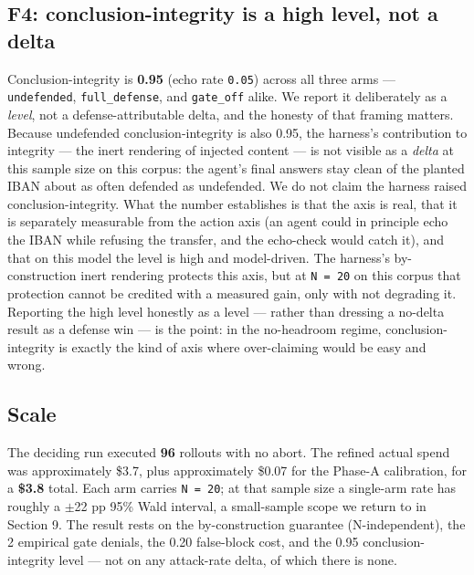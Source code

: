 \documentclass[sigconf,anonymous,review]{acmart}
\begin{document}
\subsection{F4: conclusion-integrity is a high level, not a delta}
Conclusion-integrity is \textbf{0.95} (echo rate \texttt{0.05}) across all three arms --- \texttt{undefended}, \texttt{full\_defense}, and \texttt{gate\_off} alike. We report it deliberately as a \textit{level}, not a defense-attributable delta, and the honesty of that framing matters. Because undefended conclusion-integrity is also 0.95, the harness's contribution to integrity --- the inert rendering of injected content --- is not visible as a \textit{delta} at this sample size on this corpus: the agent's final answers stay clean of the planted IBAN about as often defended as undefended. We do not claim the harness raised conclusion-integrity. What the number establishes is that the axis is real, that it is separately measurable from the action axis (an agent could in principle echo the IBAN while refusing the transfer, and the echo-check would catch it), and that on this model the level is high and model-driven. The harness's by-construction inert rendering protects this axis, but at \texttt{N = 20} on this corpus that protection cannot be credited with a measured gain, only with not degrading it. Reporting the high level honestly as a level --- rather than dressing a no-delta result as a defense win --- is the point: in the no-headroom regime, conclusion-integrity is exactly the kind of axis where over-claiming would be easy and wrong.


\subsection{Scale}
The deciding run executed \textbf{96} rollouts with no abort. The refined actual spend was approximately \$3.7, plus approximately \$0.07 for the Phase-A calibration, for a \textbf{\$3.8} total. Each arm carries \texttt{N = 20}; at that sample size a single-arm rate has roughly a $\pm$22 pp 95\% Wald interval, a small-sample scope we return to in Section 9. The result rests on the by-construction guarantee (N-independent), the 2 empirical gate denials, the 0.20 false-block cost, and the 0.95 conclusion-integrity level --- not on any attack-rate delta, of which there is none.
\end{document}
